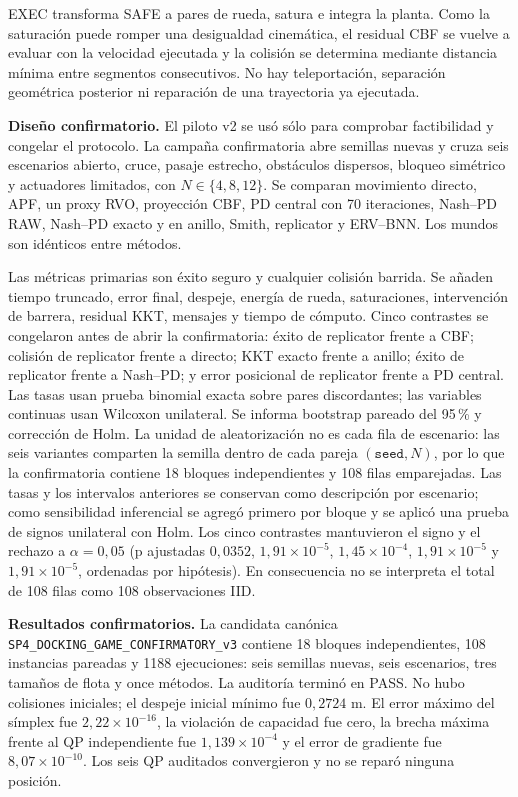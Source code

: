 EXEC transforma SAFE a pares de rueda, satura e integra la planta. Como la
saturaci\'on puede romper una desigualdad cinem\'atica, el residual CBF se vuelve a
evaluar con la velocidad ejecutada y la colisi\'on se determina mediante distancia
m\'inima entre segmentos consecutivos. No hay teleportaci\'on, separaci\'on
geom\'etrica posterior ni reparaci\'on de una trayectoria ya ejecutada.

\medskip
\noindent\textbf{Dise\~no confirmatorio.}
El piloto v2 se us\'o s\'olo para comprobar factibilidad y congelar el protocolo.
La campa\~na confirmatoria abre semillas nuevas y cruza seis escenarios
abierto, cruce, pasaje estrecho, obst\'aculos dispersos, bloqueo sim\'etrico y
actuadores limitados, con $N\in\{4,8,12\}$. Se comparan movimiento directo,
APF, un proxy RVO, proyecci\'on CBF, PD central con 70 iteraciones, Nash--PD RAW,
Nash--PD exacto y en anillo, Smith, replicator y ERV--BNN. Los mundos son
id\'enticos entre m\'etodos.

Las m\'etricas primarias son \'exito seguro y cualquier colisi\'on barrida. Se
a\~naden tiempo truncado, error final, despeje, energ\'ia de rueda, saturaciones,
intervenci\'on de barrera, residual KKT, mensajes y tiempo de c\'omputo. Cinco
contrastes se congelaron antes de abrir la confirmatoria: \'exito de replicator
frente a CBF; colisi\'on de replicator frente a directo; KKT exacto frente a
anillo; \'exito de replicator frente a Nash--PD; y error posicional de replicator
frente a PD central. Las tasas usan prueba binomial exacta sobre pares discordantes;
las variables continuas usan Wilcoxon unilateral. Se informa bootstrap pareado del
95\,\% y correcci\'on de Holm.
La unidad de aleatorizaci\'on no es cada fila de escenario: las seis variantes
comparten la semilla dentro de cada pareja $(\texttt{seed},N)$, por lo que la
confirmatoria contiene 18 bloques independientes y 108 filas emparejadas. Las
tasas y los intervalos anteriores se conservan como descripci\'on por escenario;
como sensibilidad inferencial se agreg\'o primero por bloque y se aplic\'o una
prueba de signos unilateral con Holm. Los cinco contrastes mantuvieron el signo
y el rechazo a $\alpha=0{,}05$ (p ajustadas $0{,}0352$, $1{,}91\times10^{-5}$,
$1{,}45\times10^{-4}$, $1{,}91\times10^{-5}$ y $1{,}91\times10^{-5}$,
ordenadas por hip\'otesis). En consecuencia no se interpreta el total de 108
filas como 108 observaciones IID.

\medskip
\noindent\textbf{Resultados confirmatorios.}
La candidata can\'onica \texttt{SP4\_DOCKING\_GAME\_CONFIRMATORY\_v3} contiene
18 bloques independientes, 108 instancias pareadas y 1188 ejecuciones: seis semillas nuevas, seis escenarios, tres
tama\~nos de flota y once m\'etodos. La auditor\'ia termin\'o en PASS. No hubo
colisiones iniciales; el despeje inicial m\'inimo fue $0{,}2724$ m. El error
m\'aximo del s\'implex fue $2{,}22\times10^{-16}$, la violaci\'on de capacidad fue
cero, la brecha m\'axima frente al QP independiente fue $1{,}139\times10^{-4}$ y
el error de gradiente fue $8{,}07\times10^{-10}$. Los seis QP auditados
convergieron y no se repar\'o ninguna posici\'on.

